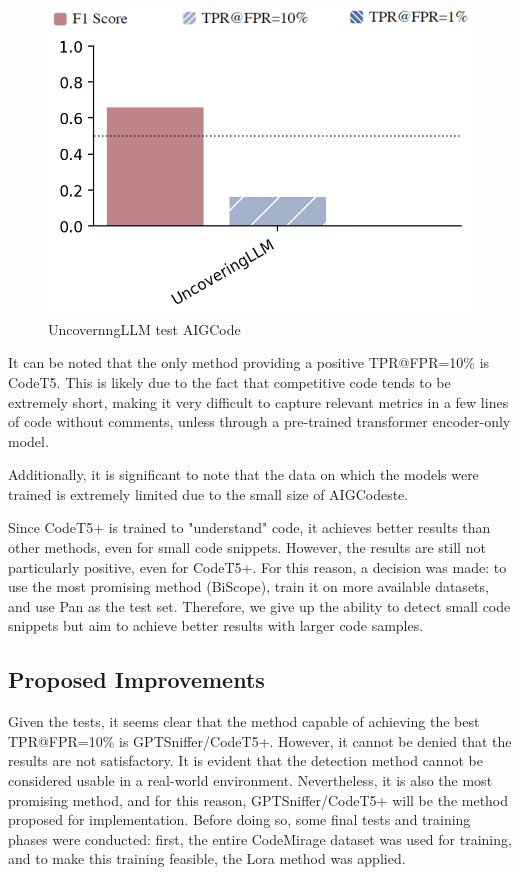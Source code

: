 \begin{figure}[H]
    \centering
    \includegraphics[width=0.5\linewidth]{img/TEST/UncovernngLLM/AIG/365f48f93ad10f5ecc7e4f2463f93e709c3fd20daa6db7c4d53cb69f.png}
    \caption{UncovernngLLM test AIGCode}
    \label{fig:c3}
\end{figure}



It can be noted that the only method providing a positive TPR@FPR=10\% is 
CodeT5. This is likely due to the fact that competitive code tends to be 
extremely short, making it very difficult to capture relevant metrics in a 
few lines of code without comments, unless through a pre-trained transformer 
encoder-only model.

Additionally, it is significant to note that the data on which the models were 
trained is extremely limited due to the small size of AIGCodeste.

Since CodeT5+ is trained to "understand" code, it achieves better results than other methods, 
even for small code snippets. However, the results are still not particularly positive, 
even for CodeT5+. For this reason, a decision was made: to use the most promising method 
(BiScope), train it on more available datasets, and use Pan as the test set. Therefore, 
we give up the ability to detect small code snippets but aim to achieve better results 
with larger code samples.

\subsection{Proposed Improvements}
Given the tests, it seems clear that the method capable of achieving 
the best TPR@FPR=10\% is GPTSniffer/CodeT5+. However, it cannot be denied 
that the results are not satisfactory. It is evident that the detection 
method cannot be considered usable in a real-world environment. Nevertheless, 
it is also the most promising method, and for this reason, GPTSniffer/CodeT5+ 
will be the method proposed for implementation. Before doing so, some final 
tests and training phases were conducted: first, the entire CodeMirage 
dataset was used for training, and to make this training feasible, the 
Lora method was applied.


